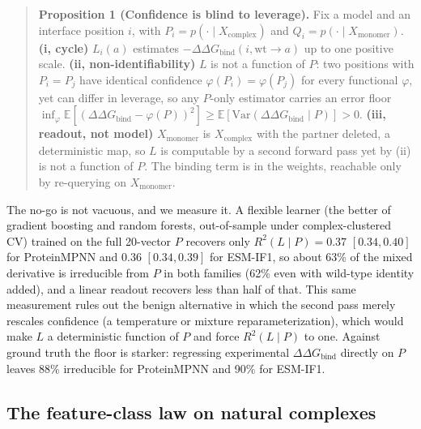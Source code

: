 \documentclass{article} %
\begin{document}
\begin{quote}
\textbf{Proposition 1 (Confidence is blind to leverage).} Fix a model and an interface position $i$, with
$P_i = p(\cdot \mid X_{\text{complex}})$ and $Q_i = p(\cdot \mid X_{\text{monomer}})$. \textbf{(i, cycle)}
$L_i(a)$ estimates $-\Delta\Delta G_{\text{bind}}(i, \text{wt} \to a)$ up to one positive scale.
\textbf{(ii, non-identifiability)} $L$ is not a function of $P$: two positions with $P_i = P_j$ have identical
confidence $\varphi(P_i) = \varphi(P_j)$ for every functional $\varphi$, yet can differ in leverage, so any
$P$-only estimator carries an error floor $\inf_\varphi \mathbb{E}[(\Delta\Delta G_{\text{bind}} - \varphi(P))^2]
\ge \mathbb{E}[\text{Var}(\Delta\Delta G_{\text{bind}} \mid P)] > 0$. \textbf{(iii, readout, not model)}
$X_{\text{monomer}}$ is $X_{\text{complex}}$ with the partner deleted, a deterministic map, so $L$ is computable by
a second forward pass yet by (ii) is not a function of $P$. The binding term is in the weights, reachable only by
re-querying on $X_{\text{monomer}}$.
\end{quote}

The no-go is not vacuous, and we measure it. A flexible learner (the better of gradient boosting and random
forests, out-of-sample under complex-clustered CV) trained on the full 20-vector $P$ recovers only $R^2(L \mid P) =
0.37$ $[0.34, 0.40]$ for ProteinMPNN and $0.36$ $[0.34, 0.39]$ for ESM-IF1, so about 63\% of the mixed derivative
is irreducible from $P$ in both families (62\% even with wild-type identity added), and a linear readout recovers
less than half of that. This same measurement rules out the benign alternative in which the second pass merely
rescales confidence (a temperature or mixture reparameterization), which would make $L$ a deterministic function of
$P$ and force $R^2(L \mid P)$ to one. Against ground truth the floor is starker: regressing experimental
$\Delta\Delta G_{\text{bind}}$ directly on $P$ leaves 88\% irreducible for ProteinMPNN and 90\% for ESM-IF1.


\subsection{The feature-class law on natural complexes}
\end{document}

